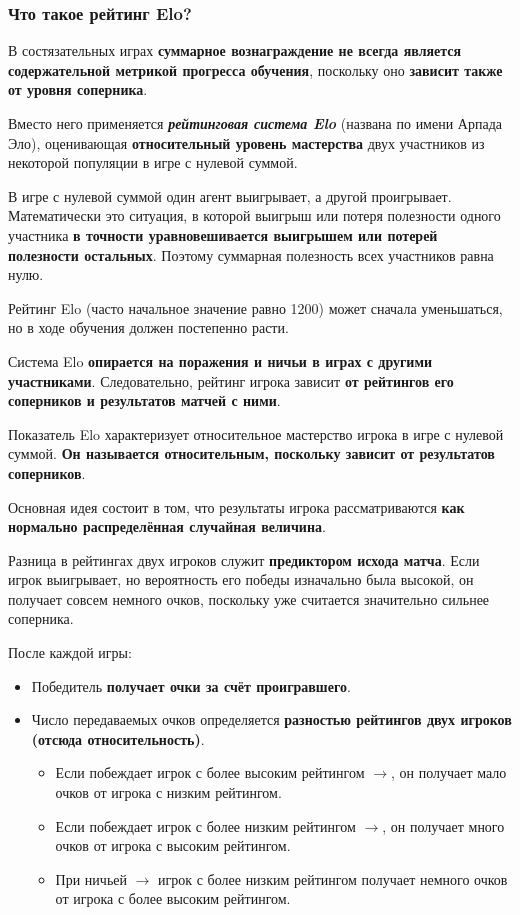 \documentclass[11pt,a4paper]{article}
\begin{document}
\subsubsection{Что такое рейтинг Elo?}\label{what-is-elo-score}

В состязательных играх \textbf{суммарное вознаграждение не всегда является содержательной метрикой прогресса обучения}, поскольку оно \textbf{зависит также от уровня соперника}.

Вместо него применяется \textbf{\emph{рейтинговая система Elo}} (названа по имени Арпада Эло), оценивающая \textbf{относительный уровень мастерства} двух участников из некоторой популяции в игре с нулевой суммой.

В игре с нулевой суммой один агент выигрывает, а другой проигрывает. Математически это ситуация, в которой выигрыш или потеря полезности одного участника \textbf{в точности уравновешивается выигрышем или потерей полезности остальных}. Поэтому суммарная полезность всех участников равна нулю.

Рейтинг Elo (часто начальное значение равно 1200) может сначала уменьшаться, но в ходе обучения должен постепенно расти.

Система Elo \textbf{опирается на поражения и ничьи в играх с другими участниками}. Следовательно, рейтинг игрока зависит \textbf{от рейтингов его соперников и результатов матчей с ними}.

Показатель Elo характеризует относительное мастерство игрока в игре с нулевой суммой. \textbf{Он называется относительным, поскольку зависит от результатов соперников}.

Основная идея состоит в том, что результаты игрока рассматриваются \textbf{как нормально распределённая случайная величина}.

Разница в рейтингах двух игроков служит \textbf{предиктором исхода матча}. Если игрок выигрывает, но вероятность его победы изначально была высокой, он получает совсем немного очков, поскольку уже считается значительно сильнее соперника.

После каждой игры:

\begin{itemize}
\tightlist
\item
  Победитель \textbf{получает очки за счёт проигравшего}.
\item
  Число передаваемых очков определяется \textbf{разностью рейтингов двух игроков (отсюда относительность)}.

  \begin{itemize}
  \tightlist
  \item
    Если побеждает игрок с более высоким рейтингом $\rightarrow$, он получает мало очков от игрока с низким рейтингом.
  \item
    Если побеждает игрок с более низким рейтингом $\rightarrow$, он получает много очков от игрока с высоким рейтингом.
  \item
    При ничьей $\rightarrow$ игрок с более низким рейтингом получает немного очков от игрока с более высоким рейтингом.
  \end{itemize}
\end{itemize}
\end{document}
